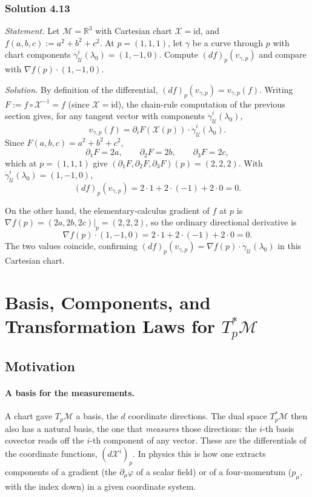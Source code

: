 \documentclass[11pt]{article}
\newcommand{\TpM}{T_p\mathcal M}
\newcommand{\TpsM}{T_p^*\mathcal M}
\begin{document}
\subsubsection*{Solution 4.13}

\noindent\textit{Statement.} Let $\mathcal M=\mathbb R^3$ with Cartesian
chart $\mathcal X=\mathrm{id}$, and $f(a,b,c):=a^2+b^2+c^2$. At
$p=(1,1,1)$, let $\gamma$ be a curve through $p$ with chart components
$\dot\gamma^i_{\mathcal U}(\lambda_0)=(1,-1,0)$. Compute $(df)_p(v_{\gamma,
p})$ and compare with $\nabla f(p)\cdot(1,-1,0)$.

\medskip
\noindent\textit{Solution.} By definition of the differential,
$(df)_p(v_{\gamma,p})=v_{\gamma,p}(f)$. Writing $F:=f\circ\mathcal
X^{-1}=f$ (since $\mathcal X=\mathrm{id}$), the chain-rule computation of
the previous section gives, for any tangent vector with components
$\dot\gamma^i_{\mathcal U}(\lambda_0)$,
\[
v_{\gamma,p}(f) = \partial_iF(\mathcal
X(p))\cdot\dot\gamma^i_{\mathcal U}(\lambda_0).
\]
Since $F(a,b,c)=a^2+b^2+c^2$,
\[
\partial_1F=2a,\qquad \partial_2F=2b,\qquad \partial_3F=2c,
\]
which at $p=(1,1,1)$ give $(\partial_1F,\partial_2F,\partial_3F)(p)=
(2,2,2)$. With $\dot\gamma^i_{\mathcal U}(\lambda_0)=(1,-1,0)$,
\[
(df)_p(v_{\gamma,p}) = 2\cdot1 + 2\cdot(-1) + 2\cdot0 = 0.
\]

On the other hand, the elementary-calculus gradient of $f$ at $p$ is
$\nabla f(p)=(2a,2b,2c)|_p=(2,2,2)$, so the ordinary directional derivative
is
\[
\nabla f(p)\cdot(1,-1,0) = 2\cdot1+2\cdot(-1)+2\cdot0 = 0.
\]
The two values coincide, confirming $(df)_p(v_{\gamma,p})=\nabla
f(p)\cdot\dot\gamma_{\mathcal U}(\lambda_0)$ in this Cartesian chart.

\section{Basis, Components, and Transformation Laws for $T_p^*\mathcal M$}

\subsection*{Motivation}

\paragraph{A basis for the measurements.}
A chart gave $\TpM$ a basis, the $d$ coordinate directions. The dual space $\TpsM$ then also has a natural basis, the one that \emph{measures} those directions: the $i$-th basis covector reads off the $i$-th component of any vector. These are the differentials of the coordinate functions, $(d\mathcal X^i)_p$. In physics this is how one extracts components of a gradient (the $\partial_\mu\varphi$ of a scalar field) or of a four-momentum ($p_\mu$, with the index down) in a given coordinate system.
\end{document}
